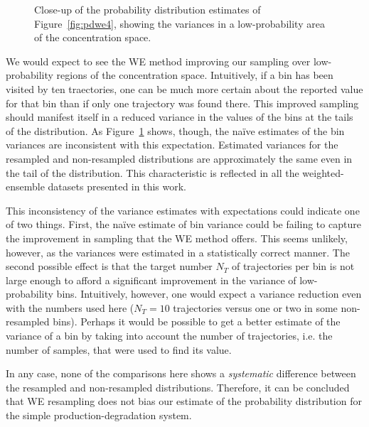 \documentclass[english,letterpaper,12pt]{report}
\begin{document}
\begin{doublespacing}
\begin{figure}[ht]
    \begin{center}
        
    \end{center}
    \caption{Close-up of the probability distribution estimates of Figure~\ref{fig:pdwe4}, showing the variances in a low-probability area of the concentration space.}
    \label{fig:pdwe-varcloseup}
\end{figure}

We would expect to see the WE method improving our sampling over low-probability regions of the concentration space. Intuitively, if a bin has been visited by ten traectories, one can be much more certain about the reported value for that bin than if only one trajectory was found there. This improved sampling should manifest itself in a reduced variance in the values of the bins at the tails of the distribution. As Figure~\ref{fig:pdwe-varcloseup} shows, though, the na\"ive estimates of the bin variances are inconsistent with this expectation. Estimated variances for the resampled and non-resampled distributions are approximately the same even in the tail of the distribution. This characteristic is reflected in all the weighted-ensemble datasets presented in this work.


This inconsistency of the variance estimates with expectations could indicate one of two things. First, the na\"ive estimate of bin variance could be failing to capture the improvement in sampling that the WE method offers. This seems unlikely, however, as the variances were estimated in a statistically correct manner. The second possible effect is that the target number $N_T$ of trajectories per bin is not large enough to afford a significant improvement in the variance of low-probability bins. Intuitively, however, one would expect a variance reduction even with the numbers used here ($N_T = 10$ trajectories versus one or two in some non-resampled bins). Perhaps it would be possible to get a better estimate of the variance of a bin by taking into account the number of trajectories, i.e. the number of samples, that were used to find its value.

In any case, none of the comparisons here shows a \emph{systematic} difference between the resampled and non-resampled distributions. Therefore, it can be concluded that WE resampling does not bias our estimate of the probability distribution for the simple production-degradation system.


\end{doublespacing}
\end{document}
